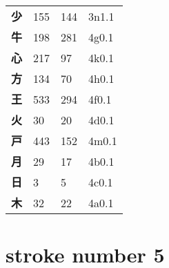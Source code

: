\begin{longtable}[c]{llll}
    \bfseries 少 & 155 & 144 & 3n1.1\\
    \bfseries 牛 & 198 & 281 & 4g0.1\\
    \bfseries 心 & 217 & 97 & 4k0.1\\
    \bfseries 方 & 134 & 70 & 4h0.1\\
    \bfseries 王 & 533 & 294 & 4f0.1\\
    \bfseries 火 & 30 & 20 & 4d0.1\\
    \bfseries 戸 & 443 & 152 & 4m0.1\\
    \bfseries 月 & 29 & 17 & 4b0.1\\
    \bfseries 日 & 3 & 5 & 4c0.1\\
    \bfseries 木 & 32 & 22 & 4a0.1\\
  \end{longtable}
\section{stroke number 5}
